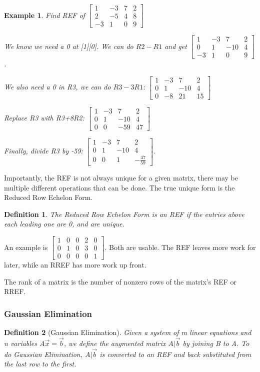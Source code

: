\documentclass{article}
\newtheorem{definition}{Definition}
\newtheorem{example}{Example}
\begin{document}
\begin{example}
	Find REF of $\begin{bmatrix}1&-3&7&2\\2&-5&4&8\\-3&1&0&9\end{bmatrix}$

	We know we need a 0 at [1][0]. We can do $R2-R1$ and get $\begin{bmatrix}
	1&-3&7&2\\0&1&-10&4\\-3&1&0&9\end{bmatrix}$.

	We also need a 0 in R3, we can do $R3-3R1$: $\begin{bmatrix} 1&-3&7&2\\0&1&-10&4\\0&-8&21&15\end{bmatrix}$

	Replace R3 with R3+8R2:  $\begin{bmatrix} 1&-3&7&2\\ 0&1&-10&4\\0&0&-59&47\end{bmatrix}$
	
	Finally, divide R3 by -59: $\begin{bmatrix} 1&-3&7&2\\ 0&1&-10&4\\0&0&1&-\frac{47}{59}\end{bmatrix}$. 
\end{example}

Importantly, the REF is not always unique for a given matrix, there may be multiple different operations that can be done. 
The true unique form is the Reduced Row Echelon Form.
\begin{definition}
	The Reduced Row Echelon Form is an REF if the entries above each leading one are 0, and are unique.
\end{definition}

An example is $\begin{bmatrix}1&0&0&2&0\\0&1&0&3&0\\0&0&0&0&1\end{bmatrix}$. 
Both are usable. The REF leaves more work for later, while an RREF has more work up front.

The rank of a matrix is the number of nonzero rows of the matrix's REF or RREF.
\subsubsection{Gaussian Elimination}
\begin{definition}[Gaussian Elimination]
	Given a system of m linear equations and n variables $A\vec{x}=\vec{b}$, we define the augmented matrix
	$A|\vec{b}$ by joining B to A. To do Gaussian Elimination, $A|\vec{b}$ is converted to an REF and back substituted from the last row to the first.
\end{definition}
\end{document}
